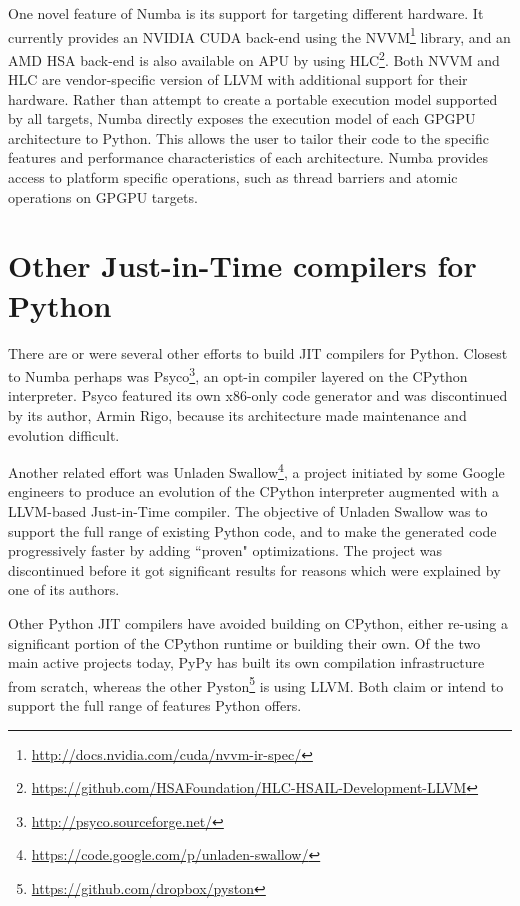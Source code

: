 \documentclass{acm_proc_article-sp}
\begin{document}
One novel feature of Numba is its support for targeting different
hardware.  It currently provides an NVIDIA CUDA\cite{CUDA} back-end using the
NVVM\footnote{\url{http://docs.nvidia.com/cuda/nvvm-ir-spec/}}
library, and an AMD HSA\cite{HSA} back-end is also available on APU by using
HLC\footnote{\url{https://github.com/HSAFoundation/HLC-HSAIL-Development-LLVM}}.
Both NVVM and HLC are vendor-specific version of LLVM with additional
support for their hardware.  Rather than attempt to create a portable
execution model supported by all targets, Numba directly exposes the
execution model of each GPGPU architecture to Python.  This allows the
user to tailor their code to the specific features and performance
characteristics of each architecture.  Numba provides access to
platform specific operations, such as thread barriers and atomic
operations on GPGPU targets.

\section{Other Just-in-Time compilers for Python}

There are or were several other efforts to build JIT compilers for
Python.  Closest to Numba perhaps was
Psyco\footnote{\url{http://psyco.sourceforge.net/}}, an opt-in
compiler layered on the CPython interpreter.  Psyco featured its own
x86-only code generator and was discontinued by its author, Armin
Rigo, because its architecture made maintenance and evolution
difficult. \cite{rigo2004representation}

Another related effort was
Unladen Swallow\footnote{\url{https://code.google.com/p/unladen-swallow/}},
a project initiated by some
Google engineers to produce an evolution of the CPython interpreter augmented
with a LLVM-based Just-in-Time compiler.
The objective of Unladen Swallow was to support the full range of existing
Python code, and to make the generated code progressively faster by adding
``proven" optimizations.  The project was discontinued before it got
significant results for reasons which were explained by one of its authors.
\cite{kleckner:unladen_swallow_post_mortem}

Other Python JIT compilers have avoided building on CPython, either
re-using a significant portion of the CPython runtime or building
their own.  Of the two main active projects today, PyPy
\cite{pypy:pypy} has built its own compilation infrastructure from
scratch, whereas the other
Pyston\footnote{\url{https://github.com/dropbox/pyston}} is using
LLVM.  Both claim or intend to support the full range of features
Python offers.
\end{document}
